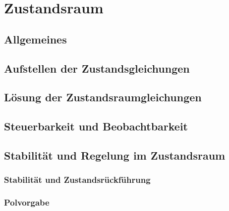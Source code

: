 \section{Zustandsraum}


\subsection{Allgemeines}


\subsection{Aufstellen der Zustandsgleichungen}


\subsection{Lösung der Zustandsraumgleichungen}


\subsection{Steuerbarkeit und Beobachtbarkeit}


\subsection{Stabilität und Regelung im Zustandsraum}


\subsubsection{Stabilität und Zustandsrückführung}


\subsubsection{Polvorgabe}
